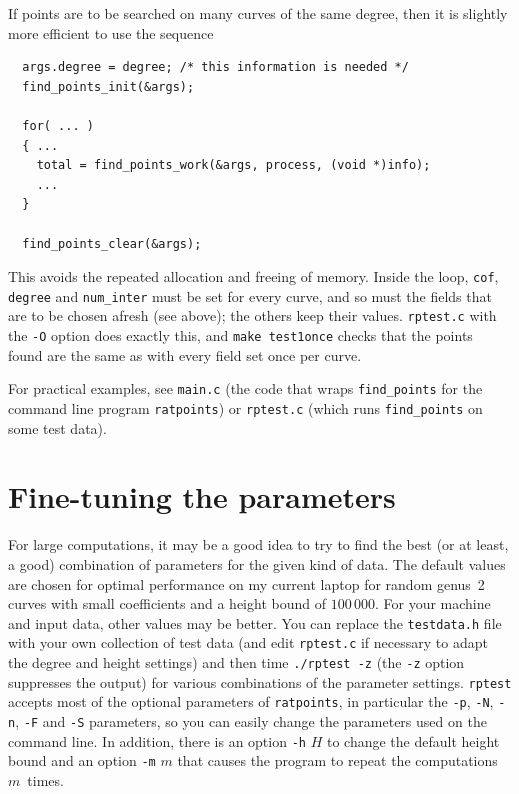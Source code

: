 \documentclass[12pt,a4paper,oneside]{amsart}
\begin{document}
If points are to be searched on many curves of the same degree,
then it is slightly more efficient to use the sequence

\begin{verbatim}
  args.degree = degree; /* this information is needed */
  find_points_init(&args);

  for( ... )
  { ...
    total = find_points_work(&args, process, (void *)info);
    ...
  }

  find_points_clear(&args);
\end{verbatim}

This avoids the repeated allocation and freeing of memory. Inside the loop,
\texttt{cof}, \texttt{degree} and \texttt{num\_inter} must be set for every
curve, and so must the fields that are to be chosen afresh (see above); the
others keep their values. \texttt{rptest.c} with the \verb+-O+ option does
exactly this, and \texttt{make test1once} checks that the points found are
the same as with every field set once per curve.

For practical examples, see \texttt{main.c} (the code that wraps
\texttt{find\_points} for the command line program \texttt{ratpoints}) or
\texttt{rptest.c} (which runs \texttt{find\_points} on some test data).


\section{Fine-tuning the parameters}

For large computations, it may be a good idea to try to find the best
(or at least, a good) combination of parameters for the given kind of data.
The default values are chosen for optimal performance on my current laptop
for random genus~2 curves with small coefficients and a height bound of
$100\,000$. For your machine
and input data, other values may be better. You can replace the
\texttt{testdata.h} file with your own collection of test data (and
edit \texttt{rptest.c} if necessary to adapt the degree and height settings)
and then time \texttt{./rptest -z} (the \verb+-z+ option suppresses the output)
for various combinations of the parameter settings. \texttt{rptest} accepts
most of the optional parameters of \texttt{ratpoints}, in particular
the \verb+-p+, \verb+-N+, \verb+-n+, \verb+-F+ and \verb+-S+ parameters,
so you can easily change the parameters used on the command line. In addition,
there is an option \verb+-h+ $H$ to change the default height bound
and an option \verb+-m+ $m$ that causes the program to repeat the
computations $m$~times.
\end{document}
